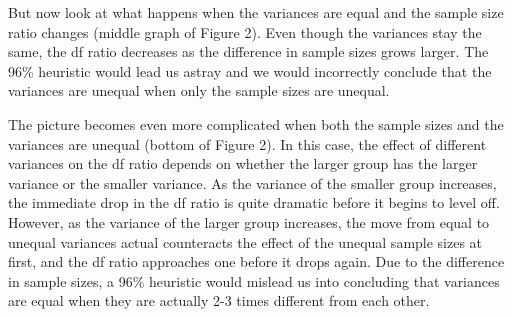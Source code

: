 \documentclass[man,a4paper,noextraspace,apacite]{apa6}
\begin{document}
    But now look at what happens when the variances are equal and the sample size ratio changes (middle graph of Figure 2). Even though the variances stay the same, the df ratio decreases as the difference in sample sizes grows larger. The 96\% heuristic would lead us astray and we would incorrectly conclude that the variances are unequal when only the sample sizes are unequal.


    The picture becomes even more complicated when both the sample sizes and the variances are unequal (bottom of Figure 2). In this case, the effect of different variances on the df ratio depends on whether the larger group has the larger variance or the smaller variance. As the variance of the smaller group increases, the immediate drop in the df ratio is quite dramatic before it begins to level off. However, as the variance of the larger group increases, the move from equal to unequal variances actual counteracts the effect of the unequal sample sizes at first, and the df ratio approaches one before it drops again. Due to the difference in sample sizes, a 96\% heuristic would mislead us into concluding that variances are equal when they are actually 2-3 times different from each other.  

\end{document}
